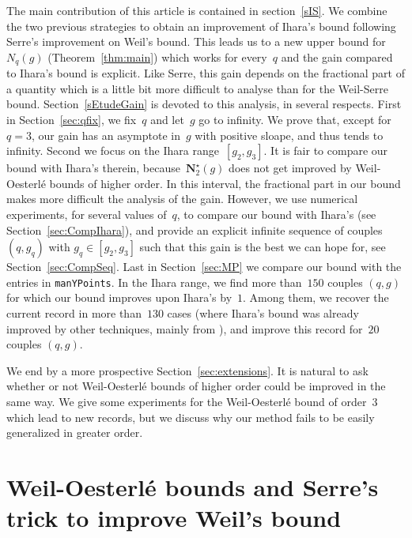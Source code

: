 \documentclass{amsart}
\newcommand{\OptimalNumber}{{\mathbf N}^\star}
\begin{document}
The main contribution of this article is contained in section~\ref{sIS}. 
We combine the two previous strategies to obtain an improvement of Ihara's bound following Serre's improvement on Weil's bound. This leads us to a new upper bound for~$N_q(g)$ (Theorem~\ref{thm:main}) which works for every~$q$ and the gain compared to Ihara's bound is explicit.
Like Serre, this gain depends on the fractional part of a quantity
which is a little bit more difficult to analyse than for the Weil-Serre bound. 
Section~\ref{sEtudeGain} is devoted to this analysis, in several respects. First in Section~\ref{sec:qfix}, we fix~$q$ and let~$g$ go to infinity. We prove that, except for~$q=3$, our gain has an asymptote in~$g$ with positive sloape, and thus tends to infinity. 
Second we focus on the Ihara range~$[g_2,g_3]$. 
It is fair to compare our bound with Ihara's therein, because~$\OptimalNumber_2(g)$ does not get improved by Weil-Oesterl\'e bounds of higher order. 
In this interval, the fractional part in our bound makes more difficult the analysis of the gain. 
However, we use numerical experiments, for several values of~$q$, to compare our bound with Ihara's (see Section~\ref{sec:CompIhara}), and provide an explicit infinite sequence of couples $(q,g_q)$ with $g_q\in [g_2,g_3]$ such that this gain is the best we can hope for, see Section~\ref{sec:CompSeq}.  
Last in Section~\ref{sec:MP} we compare our bound with the entries in {\tt manYPoints}. 
In the Ihara range, we find more than~$150$ couples $(q,g)$ for which our bound improves upon Ihara's by~$1$. 
Among them, we recover the current record in more than~$130$ cases (where Ihara's bound was already improved by other techniques, mainly from \cite{HL03, HL12}), and improve this record for~$20$ couples $(q,g)$. 

We end by a more prospective Section~\ref{sec:extensions}. It is natural to ask whether or not Weil-Oesterl\'e bounds of higher order
could be improved in the same way. We give some experiments for the Weil-Oesterl\'e bound of order~$3$ which lead to new records, but we discuss
why our method fails to be easily generalized in greater order.





\section{Weil-Oesterl\'e bounds and Serre's trick to improve Weil's bound}\label{sOS}
\end{document}
